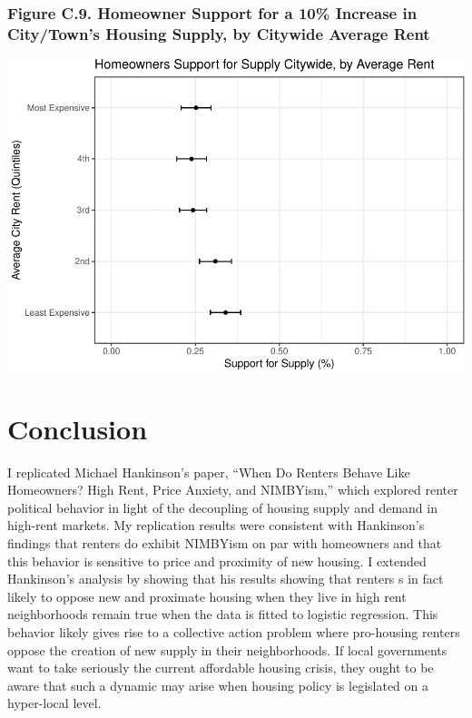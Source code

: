 \documentclass[]{article}
\begin{document}
\hypertarget{figure-c.9.-homeowner-support-for-a-10-increase-in-citytowns-housing-supply-by-citywide-average-rent}{%
\subsubsection{Figure C.9. Homeowner Support for a 10\% Increase in City/Town's Housing Supply, by Citywide Average Rent}\label{figure-c.9.-homeowner-support-for-a-10-increase-in-citytowns-housing-supply-by-citywide-average-rent}}

\includegraphics{Zheng-Ruth-Renters-Paper_files/figure-latex/Print Figure C.9-1.pdf}

\hypertarget{conclusion}{%
\section{Conclusion}\label{conclusion}}

I replicated Michael Hankinson's paper, ``When Do Renters Behave Like Homeowners? High Rent, Price Anxiety, and NIMBYism,'' which explored renter political behavior in light of the decoupling of housing supply and demand in high-rent markets. My replication results were consistent with Hankinson's findings that renters do exhibit NIMBYism on par with homeowners and that this behavior is sensitive to price and proximity of new housing. I extended Hankinson's analysis by showing that his results showing that renters s in fact likely to oppose new and proximate housing when they live in high rent neighborhoods remain true when the data is fitted to logistic regression. This behavior likely gives rise to a collective action problem where pro-housing renters oppose the creation of new supply in their neighborhoods. If local governments want to take seriously the current affordable housing crisis, they ought to be aware that such a dynamic may arise when housing policy is legislated on a hyper-local level.
\end{document}
